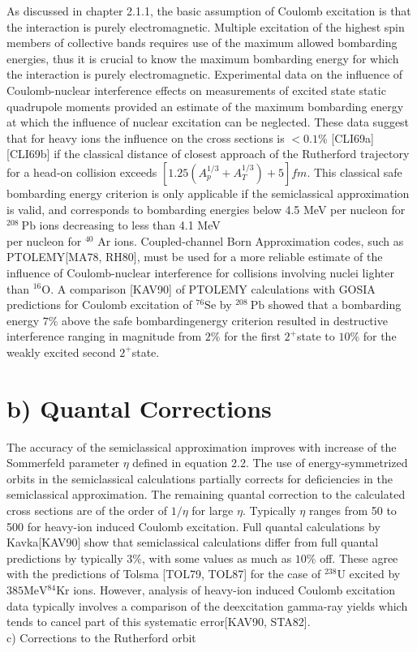 \documentclass[10pt]{article}
\begin{document}
As discussed in chapter 2.1.1, the basic assumption of Coulomb excitation is that the interaction is purely electromagnetic. Multiple excitation of the highest spin members of collective bands requires use of the maximum allowed bombarding energies, thus it is crucial to know the maximum bombarding energy for which the interaction is purely electromagnetic. Experimental data on the influence of Coulomb-nuclear interference effects on measurements of excited state static quadrupole moments provided an estimate of the maximum bombarding energy at which the influence of nuclear excitation can be neglected. These data suggest that for heavy ions the influence on the cross sections is $<0.1 \%$ [CLI69a][CLI69b] if the classical distance of closest approach of the Rutherford trajectory for a head-on collision exceeds $\left[1.25\left(A_{p}^{1 / 3}+A_{T}^{1 / 3}\right)+5\right] f m$. This classical safe bombarding energy criterion is only applicable if the semiclassical approximation is valid, and corresponds to bombarding energies below 4.5 MeV per nucleon for ${ }^{208} \mathrm{~Pb}$ ions decreasing to less than 4.1 MeV\\
per nucleon for ${ }^{40}$ Ar ions. Coupled-channel Born Approximation codes, such as PTOLEMY[MA78, RH80], must be used for a more reliable estimate of the influence of Coulomb-nuclear interference for collisions involving nuclei lighter than ${ }^{16} \mathrm{O}$. A comparison [KAV90] of PTOLEMY calculations with GOSIA predictions for Coulomb excitation of ${ }^{76} \mathrm{Se}$ by ${ }^{208} \mathrm{~Pb}$ showed that a bombarding energy $7 \%$ above the safe bombardingenergy criterion resulted in destructive interference ranging in magnitude from $2 \%$ for the first $2^{+}$state to $10 \%$ for the weakly excited second $2^{+}$state.

\section*{b) Quantal Corrections}
The accuracy of the semiclassical approximation improves with increase of the Sommerfeld parameter $\eta$ defined in equation 2.2. The use of energy-symmetrized orbits in the semiclassical calculations partially corrects for deficiencies in the semiclassical approximation. The remaining quantal correction to the calculated cross sections are of the order of $1 / \eta$ for large $\eta$. Typically $\eta$ ranges from 50 to 500 for heavy-ion induced Coulomb excitation. Full quantal calculations by Kavka[KAV90] show that semiclassical calculations differ from full quantal predictions by typically $3 \%$, with some values as much as $10 \%$ off. These agree with the predictions of Tolsma [TOL79, TOL87] for the case of ${ }^{238} \mathrm{U}$ excited by $385 \mathrm{MeV}{ }^{84} \mathrm{Kr}$ ions. However, analysis of heavy-ion induced Coulomb excitation data typically involves a comparison of the deexcitation gamma-ray yields which tends to cancel part of this systematic error[KAV90, STA82].\\
c) Corrections to the Rutherford orbit
\end{document}
